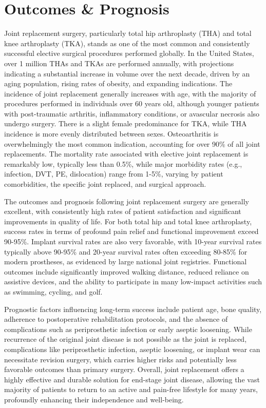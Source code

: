 \section*{Outcomes \& Prognosis}
Joint replacement surgery, particularly total hip arthroplasty (THA) and total knee arthroplasty (TKA), stands as one of the most common and consistently successful elective surgical procedures performed globally. In the United States, over 1 million THAs and TKAs are performed annually, with projections indicating a substantial increase in volume over the next decade, driven by an aging population, rising rates of obesity, and expanding indications. The incidence of joint replacement generally increases with age, with the majority of procedures performed in individuals over 60 years old, although younger patients with post-traumatic arthritis, inflammatory conditions, or avascular necrosis also undergo surgery. There is a slight female predominance for TKA, while THA incidence is more evenly distributed between sexes. Osteoarthritis is overwhelmingly the most common indication, accounting for over 90\% of all joint replacements. The mortality rate associated with elective joint replacement is remarkably low, typically less than 0.5\%, while major morbidity rates (e.g., infection, DVT, PE, dislocation) range from 1-5\%, varying by patient comorbidities, the specific joint replaced, and surgical approach.

The outcomes and prognosis following joint replacement surgery are generally excellent, with consistently high rates of patient satisfaction and significant improvements in quality of life. For both total hip and total knee arthroplasty, success rates in terms of profound pain relief and functional improvement exceed 90-95\%. Implant survival rates are also very favorable, with 10-year survival rates typically above 90-95\% and 20-year survival rates often exceeding 80-85\% for modern prostheses, as evidenced by large national joint registries. Functional outcomes include significantly improved walking distance, reduced reliance on assistive devices, and the ability to participate in many low-impact activities such as swimming, cycling, and golf.

Prognostic factors influencing long-term success include patient age, bone quality, adherence to postoperative rehabilitation protocols, and the absence of complications such as periprosthetic infection or early aseptic loosening. While recurrence of the original joint disease is not possible as the joint is replaced, complications like periprosthetic infection, aseptic loosening, or implant wear can necessitate revision surgery, which carries higher risks and potentially less favorable outcomes than primary surgery. Overall, joint replacement offers a highly effective and durable solution for end-stage joint disease, allowing the vast majority of patients to return to an active and pain-free lifestyle for many years, profoundly enhancing their independence and well-being.

